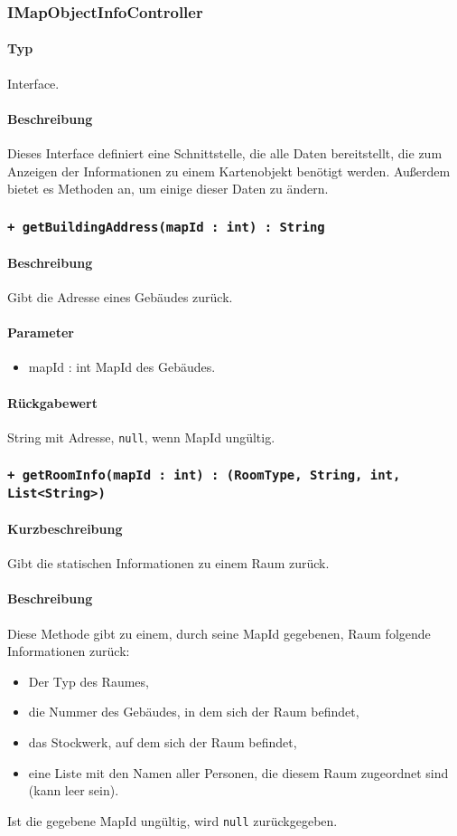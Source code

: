 \subsubsection{IMapObjectInfoController}
\paragraph*{Typ}
Interface.
\paragraph*{Beschreibung}
Dieses Interface definiert eine Schnittstelle, die alle Daten bereitstellt, 
die zum Anzeigen der Informationen zu einem Kartenobjekt benötigt werden. 
Außerdem bietet es Methoden an, um einige dieser Daten zu ändern.

\subsubsection*{\texttt{+ getBuildingAddress(mapId : int) : String}}%
\paragraph*{Beschreibung}
Gibt die Adresse eines Gebäudes zurück.
\paragraph*{Parameter}
\begin{itemize}
    \item mapId : int MapId des Gebäudes.
\end{itemize}
\paragraph*{Rückgabewert}
String mit Adresse, \texttt{null}, wenn MapId ungültig.

\subsubsection*{\texttt{+ getRoomInfo(mapId : int) : (RoomType, String, int, List<String>)}}%
\paragraph*{Kurzbeschreibung}
Gibt die statischen Informationen zu einem Raum zurück.
\paragraph*{Beschreibung}
Diese Methode gibt zu einem, durch seine MapId gegebenen, Raum folgende Informationen zurück:
\begin{itemize}
    \item Der Typ des Raumes,
    \item die Nummer des Gebäudes, in dem sich der Raum befindet,
    \item das Stockwerk, auf dem sich der Raum befindet,
    \item eine Liste mit den Namen aller Personen, die diesem Raum zugeordnet sind (kann leer sein).
\end{itemize}
Ist die gegebene MapId ungültig, wird \texttt{null} zurückgegeben.
